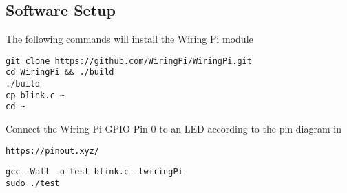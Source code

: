 %
\subsection{Software Setup}
The following commands will install the Wiring Pi module
\begin{lstlisting}
git clone https://github.com/WiringPi/WiringPi.git
cd WiringPi && ./build
./build
cp blink.c ~
cd ~
\end{lstlisting}
Connect the Wiring Pi GPIO Pin 0 to an LED according to the pin diagram in 

\begin{lstlisting}
https://pinout.xyz/
\end{lstlisting}

\begin{lstlisting}
gcc -Wall -o test blink.c -lwiringPi
sudo ./test
\end{lstlisting}

